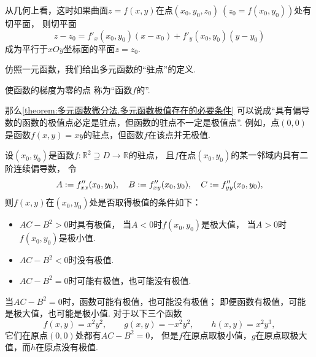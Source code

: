 从几何上看，这时如果曲面\(z=f(x,y)\)在点\((x_0,y_0,z_0)\ (z_0=f(x_0,y_0))\)处有切平面，
则切平面\begin{equation*}
	z-z_0=f'_x(x_0,y_0)(x-x_0)+f'_y(x_0,y_0)(y-y_0)
\end{equation*}成为平行于\(xOy\)坐标面的平面\(z=z_0\).

仿照一元函数，我们给出多元函数的“驻点”的定义.
\begin{definition}
使函数的梯度为零的点
称为“函数\(f\)的”.
\end{definition}
那么\cref{theorem:多元函数微分法.多元函数极值存在的必要条件}
可以说成“具有偏导数的函数的极值点必定是驻点，但函数的驻点不一定是极值点”.
例如，点\((0,0)\)是函数\(f(x,y) = xy\)的驻点，但函数\(f\)在该点并无极值.

\begin{theorem}[充分条件]\label{theorem:多元函数微分法.多元函数极值存在的充分条件}
设\((x_0,y_0)\)是函数\(f\colon \mathbb{R}^2 \supseteq D \to \mathbb{R}\)的驻点，
且\(f\)在点\((x_0,y_0)\)的某一邻域内具有二阶连续偏导数，
令\begin{equation*}
	A := f''_{xx}(x_0,y_0),
	\quad
	B := f''_{xy}(x_0,y_0),
	\quad
	C := f''_{yy}(x_0,y_0),
\end{equation*}
则\(f(x,y)\)在\((x_0,y_0)\)处是否取得极值的条件如下：
\begin{itemize}
	\item \(AC-B^2>0\)时具有极值，
	当\(A<0\)时\(f(x_0,y_0)\)是极大值，
	当\(A>0\)时\(f(x_0,y_0)\)是极小值.
	\item \(AC-B^2<0\)时没有极值.
	\item \(AC-B^2=0\)时可能有极值，也可能没有极值.
\end{itemize}
\end{theorem}

\begin{example}
当\(AC-B^2=0\)时，函数可能有极值，也可能没有极值；
即便函数有极值，可能是极大值，也可能是极小值.
对于以下三个函数\begin{equation*}
	f(x,y) = x^2 y^2,
	\qquad
	g(x,y) = -x^2 y^2,
	\qquad
	h(x,y) = x^2 y^3,
\end{equation*}
它们在原点\((0,0)\)处都有\(AC-B^2=0\)，
但是\(f\)在原点取极小值，\(g\)在原点取极大值，而\(h\)在原点没有极值.
\end{example}

